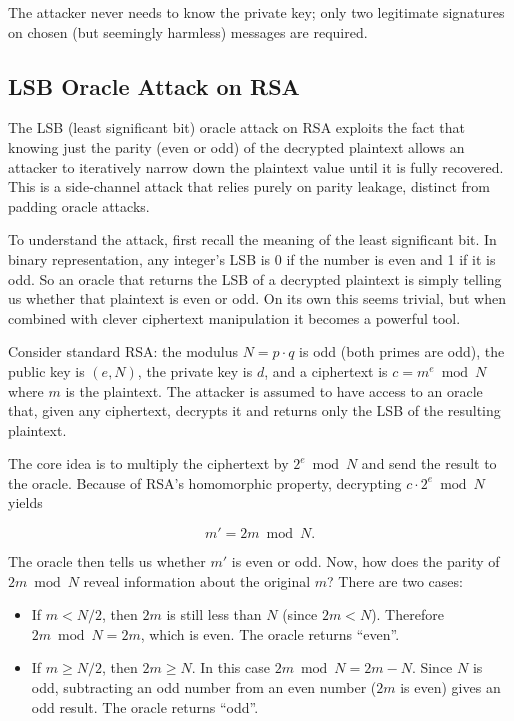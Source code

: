 The attacker never needs to know the private key; only two legitimate signatures on chosen (but seemingly harmless) messages are required.


\subsection{LSB Oracle Attack on RSA}

The LSB (least significant bit) oracle attack on RSA exploits the fact that knowing just the parity (even or odd) of the decrypted plaintext allows an attacker to iteratively narrow down the plaintext value until it is fully recovered. This is a side‑channel attack that relies purely on parity leakage, distinct from padding oracle attacks.

To understand the attack, first recall the meaning of the least significant bit. In binary representation, any integer's LSB is 0 if the number is even and 1 if it is odd. So an oracle that returns the LSB of a decrypted plaintext is simply telling us whether that plaintext is even or odd. On its own this seems trivial, but when combined with clever ciphertext manipulation it becomes a powerful tool.

Consider standard RSA: the modulus \(N = p \cdot q\) is odd (both primes are odd), the public key is \((e, N)\), the private key is \(d\), and a ciphertext is \(c = m^e \bmod N\) where \(m\) is the plaintext. The attacker is assumed to have access to an oracle that, given any ciphertext, decrypts it and returns only the LSB of the resulting plaintext.

The core idea is to multiply the ciphertext by \(2^e \bmod N\) and send the result to the oracle. Because of RSA's homomorphic property, decrypting \(c \cdot 2^e \bmod N\) yields

\[
m' = 2m \bmod N .
\]

The oracle then tells us whether \(m'\) is even or odd. Now, how does the parity of \(2m \bmod N\) reveal information about the original \(m\)? There are two cases:

\begin{itemize}
\item If \(m < N/2\), then \(2m\) is still less than \(N\) (since \(2m < N\)). Therefore \(2m \bmod N = 2m\), which is even. The oracle returns ``even''.
\item If \(m \ge N/2\), then \(2m \ge N\). In this case \(2m \bmod N = 2m - N\). Since \(N\) is odd, subtracting an odd number from an even number (\(2m\) is even) gives an odd result. The oracle returns ``odd''.
\end{itemize}

